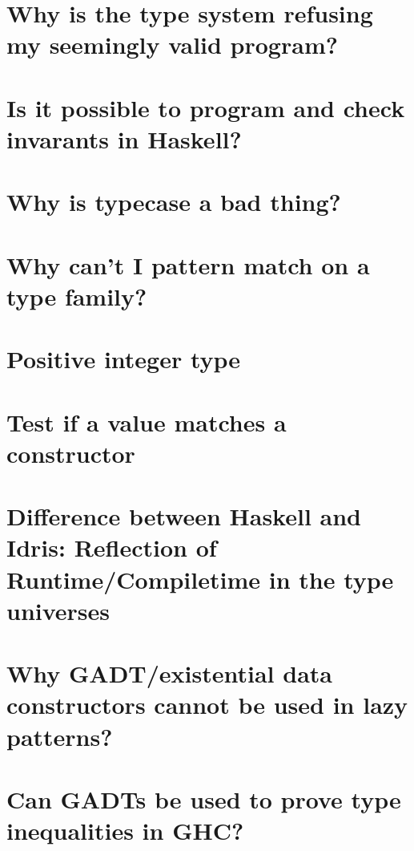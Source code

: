 \documentclass{book}%
\begin{document}
\section{Why is the type system refusing my seemingly valid program?}


\section{Is it possible to program and check invarants in Haskell?}


\section{Why is typecase a bad thing?}


\section{Why can't I pattern match on a type family?}


\section{Positive integer type}


\section{Test if a value matches a constructor}


\section{Difference between Haskell and Idris: Reflection of Runtime/Compiletime in the type universes}


\section{Why GADT/existential data constructors cannot be used in lazy patterns?}


\section{Can GADTs be used to prove type inequalities in GHC?}

\end{document}
